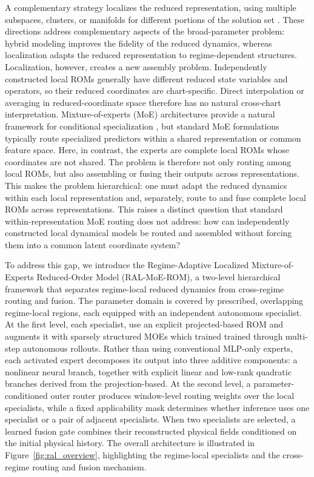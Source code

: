 \documentclass{article}
\begin{document}
A complementary strategy localizes the reduced representation, using multiple subspaces, clusters, or manifolds for different portions of the solution set \citep{kaiser2014,li2021cluster,diaz2024}. These directions address complementary aspects of the broad-parameter problem: hybrid modeling improves the fidelity of the reduced dynamics, whereas localization adapts the reduced representation to regime-dependent structures. Localization, however, creates a new assembly problem.  Independently constructed local ROMs generally have different reduced state variables and  operators, so their reduced coordinates are chart-specific. Direct interpolation or averaging in reduced-coordinate space therefore has no natural cross-chart interpretation. Mixture-of-experts (MoE) architectures provide a natural framework for conditional specialization \citep{jacobs1991,jordan1994,shazeer2017,fedus2022}, but standard MoE formulations typically route specialized predictors within a shared representation or common feature space. Here, in contrast, the experts are complete local ROMs whose coordinates are not shared. The problem is therefore not only routing among local ROMs, but also assembling or fusing their outputs across representations. This makes the problem hierarchical: one must adapt the reduced dynamics within each local representation and, separately, route to and fuse complete local ROMs across representations. This raises a distinct question that standard within-representation MoE routing does not address: how can independently constructed local dynamical models be routed and assembled without forcing them into a common latent coordinate system?


To address this gap, we introduce the Regime-Adaptive Localized Mixture-of-Experts Reduced-Order Model (RAL-MoE-ROM), a two-level hierarchical framework that separates regime-local reduced dynamics from cross-regime routing and fusion. The parameter domain is covered by prescribed, overlapping regime-local regions, each equipped with an independent  autonomous specialist. At the first level, each specialist, use an explicit projected-based ROM  and augments it with sparsely  structured MOEs which trained trained through  multi-step autonomous rollouts. Rather than using conventional MLP-only experts, each activated expert decomposes its output into three additive components: a nonlinear neural branch, together with explicit linear and low-rank quadratic branches derived from the projection-based. At the second level, a parameter-conditioned outer router produces window-level routing weights over the local specialists, while a fixed applicability mask determines whether inference uses one specialist or a pair of adjacent specialists. When two specialists are selected, a learned fusion gate combines their reconstructed physical fields conditioned on the initial physical history. The overall architecture is illustrated in Figure~\ref{fig:ral_overview}, highlighting the regime-local specialists and the cross-regime routing and fusion mechanism.
\end{document}
